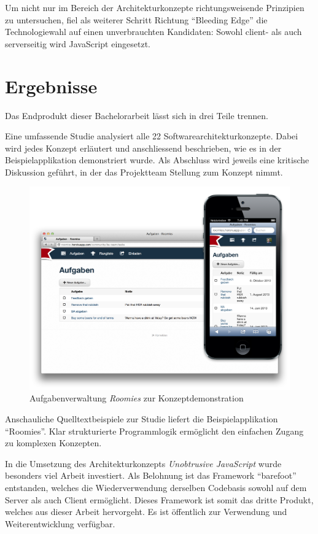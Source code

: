 Um nicht nur im Bereich der Architekturkonzepte richtungsweisende Prinzipien zu untersuchen, fiel als weiterer Schritt Richtung ``Bleeding Edge'' die Technologiewahl auf einen unverbrauchten Kandidaten: Sowohl client- als auch serverseitig wird JavaScript eingesetzt.


\section{Ergebnisse}

Das Endprodukt dieser Bachelorarbeit lässt sich in drei Teile trennen.

Eine umfassende Studie analysiert alle 22 Softwarearchitekturkonzepte. Dabei wird jedes Konzept erläutert und anschliessend beschrieben, wie es in der Beispielapplikation demonstriert wurde. Als Abschluss wird jeweils eine kritische Diskussion geführt, in der das Projektteam Stellung zum Konzept nimmt.

\begin{figure}[H]
	\centering
	\includegraphics[width=12cm]{content/principle-demonstration/images/responsive-screenshots.png}
	\caption{Aufgabenverwaltung \emph{Roomies} zur Konzeptdemonstration}
\end{figure}

Anschauliche Quelltextbeispiele zur Studie liefert die Beispielapplikation ``Roomies''. Klar strukturierte Programmlogik ermöglicht den einfachen Zugang  zu komplexen Konzepten.

In die Umsetzung des Architekturkonzepts \emph{Unobtrusive JavaScript} wurde besonders viel Arbeit investiert. Als Belohnung ist das Framework ``barefoot'' entstanden, welches die Wiederverwendung derselben Codebasis sowohl auf dem Server als auch Client ermöglicht. Dieses Framework ist somit das dritte Produkt, welches aus dieser Arbeit hervorgeht. Es ist öffentlich zur Verwendung und Weiterentwicklung verfügbar.


